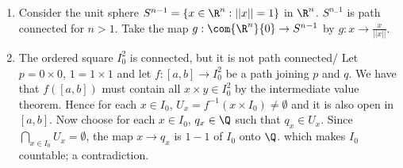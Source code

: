 \begin{example}
\begin{enumerate}[label=(\arabic*)]
    \item Consider the unit sphere $S^{n-1}=\{x \in \R^n:||x||=1\}$ in $\R^n$.  $S^{n_-1}$ is path
        connected for $n>1$. Take the map  $g:\com{\R^n}\{0\} \rightarrow S^{n-1}$ by $g:x
        \rightarrow \frac{x}{||x||}$.

    \item The ordered square $ I_0^2$ is connected, but it is not path connected/ Let $p=0 \times
        0$,  $1=1 \times 1$ and let  $f:[a,b] \rightarrow I_0^2$ be a path joining $p$ and  $q$. We
        have that  $f([a,b])$ must contain all $x \times y \in I_0^2$ by the intermediate value
        theorem. Hence for each  $x \in I_0$, $U_x=f^{-1}(x \times I_0) \neq \emptyset$ and it is
        also open in $[a,b]$. Now choose for each $x \in I_0$, $q_x \in \Q$ such that  $q_x \in
        U_x$. Since  $\bigcap_{x \in I_0}{U_x} = \emptyset$, the map $x \rightarrow q_x$ is  $1-1$
        of  $I_0$ onto $\Q$. which makes $I_0$ countable; a contradiction.


\end{enumerate}
\end{example}
